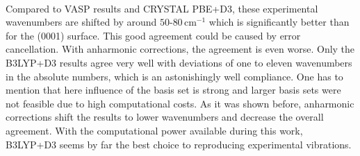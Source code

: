 \documentclass[11pt,DIV=13,BCOR=5mm,a4paper,headinclude]{scrbook}
\begin{document}
\\
Compared to VASP results and CRYSTAL PBE+D3, these experimental wavenumbers are shifted by around $50$-$80\,$cm$^{-1}$ which is significantly better than for the (0001) surface.
This good agreement could be caused by error cancellation.
With anharmonic corrections, the agreement is even worse.
Only the B3LYP+D3 results agree very well with deviations of one to eleven wavenumbers in the absolute numbers, which is an astonishingly well compliance.
One has to mention that here influence of the basis set is strong and larger basis sets were not feasible due to high computational costs.
As it was shown before, anharmonic corrections shift the results to lower wavenumbers and decrease the overall agreement.
With the computational power available during this work, B3LYP+D3 seems by far the best choice to reproducing experimental vibrations.
\end{document}
